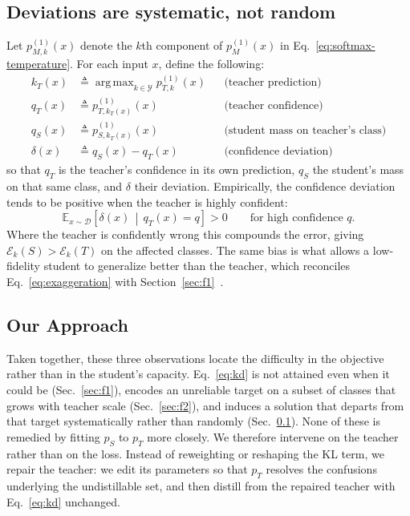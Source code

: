 \documentclass[review,number,sort&compress]{elsarticle}
\theoremstyle{definition}
\DeclareMathOperator*{\argmax}{arg\,max}
\begin{document}
\subsection{Deviations are systematic, not random}
\label{sec:f3}

Let $p_{M,k}^{(1)}(x)$ denote the $k$th component of $p_M^{(1)}(x)$ in
Eq.~\eqref{eq:softmax-temperature}. For each input $x$, define the following:
\begin{align*}
k_T(x) &\triangleq \argmax_{k\in\mathcal{Y}} p_{T,k}^{(1)}(x)
  && \text{(teacher prediction)} \\
q_T(x) &\triangleq p_{T,k_T(x)}^{(1)}(x)
  && \text{(teacher confidence)} \\
q_S(x) &\triangleq p_{S,k_T(x)}^{(1)}(x)
  && \text{(student mass on teacher's class)} \\
\delta(x) &\triangleq q_S(x) - q_T(x)
  && \text{(confidence deviation)}
\end{align*}
so that $q_T$ is the teacher's confidence in its own prediction, $q_S$ the
student's mass on that same class, and $\delta$ their deviation. Empirically,
the confidence deviation tends to be positive when the teacher is highly
confident:
\begin{equation}
\label{eq:exaggeration}
\mathbb{E}_{x\sim\mathcal{D}}\!\left[
\delta(x) \,\middle|\, q_T(x)=q
\right] > 0
\qquad \text{for high confidence } q.
\end{equation}
Where the teacher is confidently wrong this compounds the error, giving
$\mathcal{E}_k(S) > \mathcal{E}_k(T)$ on the affected classes. The same bias is
what allows a low-fidelity student to generalize better than the teacher, which
reconciles Eq.~\eqref{eq:exaggeration} with
Section~\ref{sec:f1}~\citep{nagarajan2023student}.

\subsection{Our Approach}
\label{subsec:approach}

Taken together, these three observations locate the difficulty in the
objective rather than in the student's capacity. Eq.~\eqref{eq:kd} is not
attained even when it could be (Sec.~\ref{sec:f1}), encodes an unreliable
target on a subset of classes that grows with teacher scale
(Sec.~\ref{sec:f2}), and induces a solution that departs from that target
systematically rather than randomly (Sec.~\ref{sec:f3}). None of these is
remedied by fitting $p_S$ to $p_T$ more closely. We therefore intervene on the
teacher rather than on the loss. Instead of reweighting or reshaping the KL
term, we repair the teacher: we edit its parameters so that $p_T$ resolves
the confusions underlying the undistillable set, and then distill from the
repaired teacher with Eq.~\eqref{eq:kd} unchanged.
\end{document}
